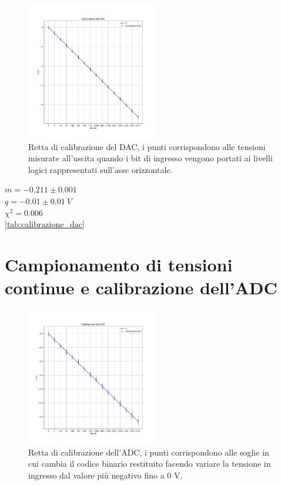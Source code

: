 \documentclass[journal]{IEEEtran}
\begin{document}
\begin{figure}[t]%
\centering
\begin{center}
\includegraphics[width=0.51\textwidth]{analysis/output/calibrazione_dac.pdf}
\end{center}
\caption{Retta di calibrazione del DAC, i punti corrispondono alle tensioni misurate all'uscita quando i bit di ingresso vengono portati ai livelli logici rappresentati sull'asse orizzontale.}
\label{fig:graph_calibrazione_dac}
\end{figure}

$ m = -0.211 \pm 0.001 $ \\
$ q = -0.01 \pm 0.01 \ V $ \\
$ \chi^{2} = 0.006 $ \\

\ref{tab:calibrazione_dac}


\section{Campionamento di tensioni continue e calibrazione dell'ADC}

\begin{figure}[t]%
\centering
\begin{center}
\includegraphics[width=0.51\textwidth]{analysis/output/calibrazione_adc.pdf}
\end{center}
\caption{Retta di calibrazione dell'ADC, i punti corrispondono alle soglie in cui cambia il codice binario restituito facendo variare la tensione in ingresso dal valore più negativo fino a 0 V.}
\label{fig:graph_calibrazione_adc}
\end{figure}
\end{document}
